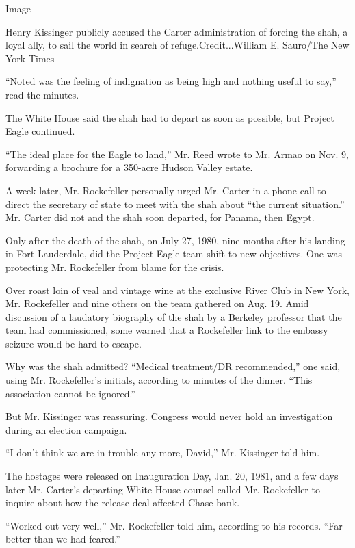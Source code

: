 Image

Henry Kissinger publicly accused the Carter administration of forcing
the shah, a loyal ally, to sail the world in search of
refuge.Credit...William E. Sauro/The New York Times

``Noted was the feeling of indignation as being high and nothing useful
to say,'' read the minutes.

The White House said the shah had to depart as soon as possible, but
Project Eagle continued.

``The ideal place for the Eagle to land,'' Mr. Reed wrote to Mr. Armao
on Nov. 9, forwarding a brochure for
\href{https://leadingestates.com/estates/hammersley-hill-pawling-new-york/}{a
350-acre Hudson Valley estate}.

A week later, Mr. Rockefeller personally urged Mr. Carter in a phone
call to direct the secretary of state to meet with the shah about ``the
current situation.'' Mr. Carter did not and the shah soon departed, for
Panama, then Egypt.

Only after the death of the shah, on July 27, 1980, nine months after
his landing in Fort Lauderdale, did the Project Eagle team shift to new
objectives. One was protecting Mr. Rockefeller from blame for the
crisis.

Over roast loin of veal and vintage wine at the exclusive River Club in
New York, Mr. Rockefeller and nine others on the team gathered on Aug.
19. Amid discussion of a laudatory biography of the shah by a Berkeley
professor that the team had commissioned, some warned that a Rockefeller
link to the embassy seizure would be hard to escape.

Why was the shah admitted? ``Medical treatment/DR recommended,'' one
said, using Mr. Rockefeller's initials, according to minutes of the
dinner. ``This association cannot be ignored.''

But Mr. Kissinger was reassuring. Congress would never hold an
investigation during an election campaign.

``I don't think we are in trouble any more, David,'' Mr. Kissinger told
him.

The hostages were released on Inauguration Day, Jan. 20, 1981, and a few
days later Mr. Carter's departing White House counsel called Mr.
Rockefeller to inquire about how the release deal affected Chase bank.

``Worked out very well,'' Mr. Rockefeller told him, according to his
records. ``Far better than we had feared.''

